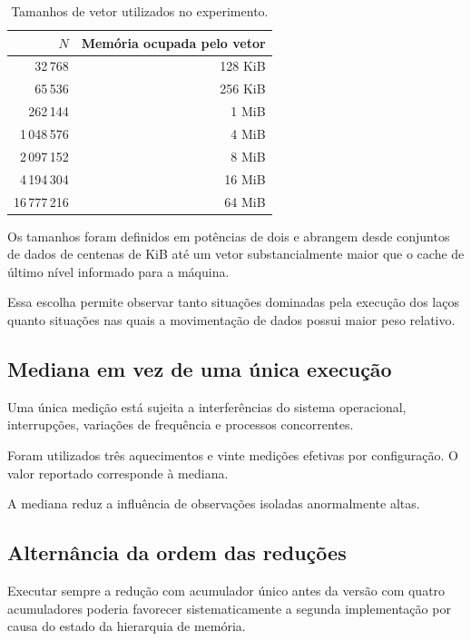 \begin{table}[htbp]
    \centering
    \caption{Tamanhos de vetor utilizados no experimento.}
    \label{tab:atvd02-tamanhos}
    \begin{tabular}{r|r}
        \hline
        \(N\) & Memória ocupada pelo vetor \\
        \hline
        32\,768     & 128 KiB \\
        65\,536     & 256 KiB \\
        262\,144    & 1 MiB \\
        1\,048\,576 & 4 MiB \\
        2\,097\,152 & 8 MiB \\
        4\,194\,304 & 16 MiB \\
        16\,777\,216 & 64 MiB \\
        \hline
    \end{tabular}
\end{table}

Os tamanhos foram definidos em potências de dois e abrangem desde conjuntos de dados de
centenas de KiB até um vetor substancialmente maior que o cache de último nível informado
para a máquina.

Essa escolha permite observar tanto situações dominadas pela execução dos laços quanto
situações nas quais a movimentação de dados possui maior peso relativo.


\subsection{Mediana em vez de uma única execução}

Uma única medição está sujeita a interferências do sistema operacional, interrupções,
variações de frequência e processos concorrentes.

Foram utilizados três aquecimentos e vinte medições efetivas por configuração. O valor
reportado corresponde à mediana.

A mediana reduz a influência de observações isoladas anormalmente altas.


\subsection{Alternância da ordem das reduções}

Executar sempre a redução com acumulador único antes da versão com quatro acumuladores poderia
favorecer sistematicamente a segunda implementação por causa do estado da hierarquia de
memória.

